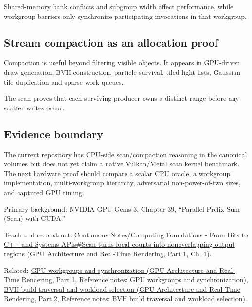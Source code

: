 Shared-memory bank conflicts and subgroup width affect performance, while workgroup barriers only synchronize participating invocations in that workgroup.

\subsection{Stream compaction as an allocation proof}\label{appendix-f2ee4d086415-stream-compaction-as-an-allocation-proof}

\hypertarget{appendix-f2ee4d086415-stream-compaction-as-an-allocation-proof}{}

Compaction is useful beyond filtering visible objects. It appears in GPU-driven draw generation, BVH construction, particle survival, tiled light lists, Gaussian tile duplication and sparse work queues.

The scan proves that each surviving producer owns a distinct range before any scatter writes occur.

\subsection{Evidence boundary}\label{appendix-f2ee4d086415-evidence-boundary}

\hypertarget{appendix-f2ee4d086415-evidence-boundary}{}

The current repository has CPU-side scan/compaction reasoning in the canonical volumes but does not yet claim a native Vulkan/Metal scan kernel benchmark. The next hardware proof should compare a scalar CPU oracle, a workgroup implementation, multi-workgroup hierarchy, adversarial non-power-of-two sizes, and captured GPU timing.

Primary background: NVIDIA GPU Gems 3, Chapter 39, ``Parallel Prefix Sum (Scan) with CUDA.''

Teach and reconstruct: \href{../06-GPU-Architecture-and-Real-Time-Rendering-P01/main.pdf\#01-foundations-i-ch008-scan-turns-local-counts-into-nonoverlapping-output-regions}{Continuous Notes/Computing Foundations - From Bits to C++ and Systems APIs\#Scan turns local counts into nonoverlapping output regions (GPU Architecture and Real-Time Rendering, Part 1, Ch. 1)}.

Related: \href{../06-GPU-Architecture-and-Real-Time-Rendering-P01/main.pdf\#appendix-f662b5b1773b}{GPU workgroups and synchronization (GPU Architecture and Real-Time Rendering, Part 1, Reference notes: GPU workgroups and synchronization)}, \href{../06-GPU-Architecture-and-Real-Time-Rendering-P02/main.pdf\#appendix-5653a7aea6bb}{BVH build traversal and workload selection (GPU Architecture and Real-Time Rendering, Part 2, Reference notes: BVH build traversal and workload selection)}.
